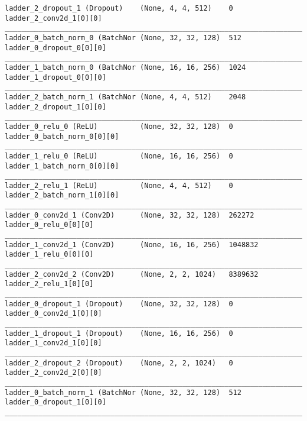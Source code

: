 \begin{lstlisting}[caption={dSprites-\ac{VLAE} Encoder},captionpos=b,basicstyle=\tiny, label={lst:dsprites-vlae-encoder}]
ladder_2_dropout_1 (Dropout)    (None, 4, 4, 512)    0           ladder_2_conv2d_1[0][0]
__________________________________________________________________________________________________
ladder_0_batch_norm_0 (BatchNor (None, 32, 32, 128)  512         ladder_0_dropout_0[0][0]
__________________________________________________________________________________________________
ladder_1_batch_norm_0 (BatchNor (None, 16, 16, 256)  1024        ladder_1_dropout_0[0][0]
__________________________________________________________________________________________________
ladder_2_batch_norm_1 (BatchNor (None, 4, 4, 512)    2048        ladder_2_dropout_1[0][0]
__________________________________________________________________________________________________
ladder_0_relu_0 (ReLU)          (None, 32, 32, 128)  0           ladder_0_batch_norm_0[0][0]
__________________________________________________________________________________________________
ladder_1_relu_0 (ReLU)          (None, 16, 16, 256)  0           ladder_1_batch_norm_0[0][0]
__________________________________________________________________________________________________
ladder_2_relu_1 (ReLU)          (None, 4, 4, 512)    0           ladder_2_batch_norm_1[0][0]
__________________________________________________________________________________________________
ladder_0_conv2d_1 (Conv2D)      (None, 32, 32, 128)  262272      ladder_0_relu_0[0][0]
__________________________________________________________________________________________________
ladder_1_conv2d_1 (Conv2D)      (None, 16, 16, 256)  1048832     ladder_1_relu_0[0][0]
__________________________________________________________________________________________________
ladder_2_conv2d_2 (Conv2D)      (None, 2, 2, 1024)   8389632     ladder_2_relu_1[0][0]
__________________________________________________________________________________________________
ladder_0_dropout_1 (Dropout)    (None, 32, 32, 128)  0           ladder_0_conv2d_1[0][0]
__________________________________________________________________________________________________
ladder_1_dropout_1 (Dropout)    (None, 16, 16, 256)  0           ladder_1_conv2d_1[0][0]
__________________________________________________________________________________________________
ladder_2_dropout_2 (Dropout)    (None, 2, 2, 1024)   0           ladder_2_conv2d_2[0][0]
__________________________________________________________________________________________________
ladder_0_batch_norm_1 (BatchNor (None, 32, 32, 128)  512         ladder_0_dropout_1[0][0]
__________________________________________________________________________________________________

\end{lstlisting}
